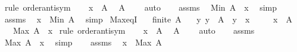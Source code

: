 \begin{isabellebody}
\isamarkupfalse%
\ {\isacharparenleft}{\kern0pt}rule\ order{\isachardot}{\kern0pt}antisym{\isacharparenright}{\kern0pt}\isanewline
\ \ \isamarkupfalse%
\ {\isacartoucheopen}x\ {\isasymin}\ A{\isacartoucheclose}\ \isamarkupfalse%
\ {\isachardoublequoteopen}A\ {\isasymnoteq}\ {\isacharbraceleft}{\kern0pt}{\isacharbraceright}{\kern0pt}{\isachardoublequoteclose}\ \isamarkupfalse%
\ auto\isanewline
\ \ \isamarkupfalse%
\ assms\ \isamarkupfalse%
\ {\isachardoublequoteopen}Min\ A\ {\isasymge}\ x{\isachardoublequoteclose}\ \isamarkupfalse%
\ simp\isanewline
{}\isamarkupfalse%
\isanewline
\ \ \isamarkupfalse%
\ assms\ \isamarkupfalse%
\ {\isachardoublequoteopen}x\ {\isasymge}\ Min\ A{\isachardoublequoteclose}\ \isamarkupfalse%
\ simp\isanewline
{}\isamarkupfalse%
%
\endisatagproof
{\isafoldproof}%
%
\isadelimproof
\isanewline
%
\endisadelimproof
\isanewline
{}\isamarkupfalse%
\ Max{\isacharunderscore}{\kern0pt}eqI{\isacharcolon}{\kern0pt}\isanewline
\ \ \ {\isachardoublequoteopen}finite\ A{\isachardoublequoteclose}\isanewline
\ \ \ {\isachardoublequoteopen}{\isasymAnd}y{\isachardot}{\kern0pt}\ y\ {\isasymin}\ A\ {\isasymLongrightarrow}\ y\ {\isasymle}\ x{\isachardoublequoteclose}\isanewline
\ \ \ \ \ {\isachardoublequoteopen}x\ {\isasymin}\ A{\isachardoublequoteclose}\isanewline
\ \ \ {\isachardoublequoteopen}Max\ A\ {\isacharequal}{\kern0pt}\ x{\isachardoublequoteclose}\isanewline
%
\isadelimproof
%
\endisadelimproof
%
\isatagproof
{}\isamarkupfalse%
\ {\isacharparenleft}{\kern0pt}rule\ order{\isachardot}{\kern0pt}antisym{\isacharparenright}{\kern0pt}\isanewline
\ \ \isamarkupfalse%
\ {\isacartoucheopen}x\ {\isasymin}\ A{\isacartoucheclose}\ \isamarkupfalse%
\ {\isachardoublequoteopen}A\ {\isasymnoteq}\ {\isacharbraceleft}{\kern0pt}{\isacharbraceright}{\kern0pt}{\isachardoublequoteclose}\ \isamarkupfalse%
\ auto\isanewline
\ \ \isamarkupfalse%
\ assms\ \isamarkupfalse%
\ {\isachardoublequoteopen}Max\ A\ {\isasymle}\ x{\isachardoublequoteclose}\ \isamarkupfalse%
\ simp\isanewline
{}\isamarkupfalse%
\isanewline
\ \ \isamarkupfalse%
\ assms\ \isamarkupfalse%
\ {\isachardoublequoteopen}x\ {\isasymle}\ Max\ A{\isachardoublequoteclose}\ \isamarkupfalse%

\end{isabellebody}
